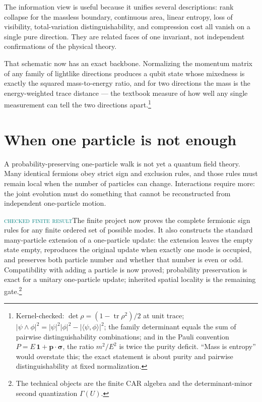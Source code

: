 \documentclass[11pt]{article}
\newcommand{\Mlabel}{\textcolor{teal}{\textsc{checked finite result}}}
\begin{document}
The information view is useful because it unifies several descriptions:
rank collapse for the massless boundary, continuous area, linear
entropy, loss of visibility, total-variation
distinguishability, and compression cost all vanish on a single pure direction.
They are related faces of one invariant, not independent confirmations of the
physical theory.

That schematic now has an exact backbone.  Normalizing the momentum matrix
of any family of lightlike directions produces a qubit state whose
mixedness is exactly the squared mass-to-energy ratio, and for two
directions the mass is the energy-weighted trace distance --- the textbook
measure of how well any single measurement can tell the two directions
apart.\footnote{Kernel-checked: $\det\rho=(1-\operatorname{tr}\rho^2)/2$ at
unit trace; $|\psi\wedge\phi|^2=|\psi|^2|\phi|^2-|\langle\psi,\phi\rangle|^2$;
the family determinant equals the sum of pairwise distinguishability
combinations; and in the Pauli convention $P=E\,\mathbf 1+\mathbf
p\cdot\boldsymbol\sigma$, the ratio $m^2/E^2$ is twice the purity deficit.
``Mass is entropy'' would overstate this; the exact statement is about
purity and pairwise distinguishability at fixed normalization.}

\section{When one particle is not enough}

A probability-preserving one-particle walk is not yet a quantum field theory.
Many identical fermions obey strict sign and exclusion rules, and those rules
must remain local when the number of particles can change.  Interactions
require more: the joint evolution must do something that cannot be reconstructed
from independent one-particle motion.

\Mlabel\quad The finite project now proves the complete fermionic sign rules for
any finite ordered set of possible modes.  It also constructs the standard
many-particle extension of a one-particle update: the extension leaves the
empty state empty, reproduces the original update when exactly one mode is
occupied, and preserves both particle number and whether that number is even
or odd.  Compatibility with adding a particle is now proved; probability
preservation is exact for a unitary one-particle update; inherited spatial locality is the remaining gate.\footnote{The technical
objects are the finite CAR algebra and the determinant-minor second
quantization $\Gamma(U)$.}
\end{document}
